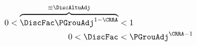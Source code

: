   \begin{align}
    0 < \overbrace{\DiscFac \PGrouAdj^{1-\CRRA} }^{\equiv \DiscAltuAdj}  & < 1 \notag
    \\ 0 < \DiscFac  & < \PGrouAdj^{\CRRA-1} \label{eq:FVAC}
  \end{align}
